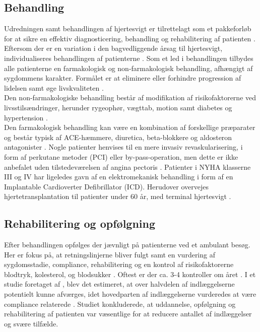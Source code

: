\subsection{Behandling}
Udredningen samt behandlingen af hjertesvigt er tilrettelagt som et pakkeforløb \citep{sstpakke} for at sikre en effektiv diagnosticering, behandling og rehabilitering af patienten \citep{sstpakke}. Eftersom der er en variation i den bagvedliggende årsag til hjertesvigt, individualiseres behandlingen af patienterne \citep{TSchroeder2016}. Som et led i behandlingen tilbydes alle patienterne en farmakologisk og non-farmakologisk behandling, afhængigt af sygdommens karakter. Formålet er at eliminere eller forhindre progression af lidelsen samt øge livskvaliteten \citep{sstpakke}.\\
Den non-farmakologiske behandling består af modifikation af risikofaktorerne ved livsstilsændringer, herunder rygeophør, vægttab, motion samt diabetes og hypertension \citep{Hjerteinsufficiens}.\\
Den farmakologisk behandling kan være en kombination af forskellige præparater og består typisk af ACE-hæmmere, diuretica, beta-blokkere og aldosteron antagonister \citep{TSchroeder2016}\citep{sstpakke}. Nogle patienter henvises til en mere invasiv revaskularisering, i form af perkutane metoder (PCI) eller by-pass-operation, men dette er ikke anbefalet uden tilstedeværelsen af angina pectoris \citep{sstpakke}. Patienter i NYHA klasserne III og IV har ligeledes gavn af en elektromekanisk behandling i form af en Implantable Cardioverter Defibrillator (ICD). Herudover overvejes hjertetransplantation til patienter under 60 år, med terminal hjertesvigt \citep{edok}\citep{Hjerteinsufficiens}.

\subsection{Rehabilitering og opfølgning}
Efter behandlingen opfølges der jævnligt på patienterne ved et ambulant besøg. Her er fokus på, at retningslinjerne bliver fulgt samt en vurdering af sygdomsstadie, compliance, rehabilitering og en kontrol af risikofaktorerne blodtryk, kolesterol, og blodsukker \citep{Hjerteinsufficiens}\citep{edok}. Oftest er der ca. 3-4 kontroller om året \citep{edok}. I et studie foretaget af \citet{Michalsen1998}, blev det estimeret, at over halvdelen af indlæggelserne potentielt kunne afværges, idet hovedparten af indlæggelserne vurderedes at være compliance relaterede \citep{Michalsen1998,Hjerteinsufficiens}. Studiet konkluderede, at uddannelse, opfølgning og rehabilitering af patienten var væsentlige for at reducere antallet af indlæggelser og svære tilfælde. 

